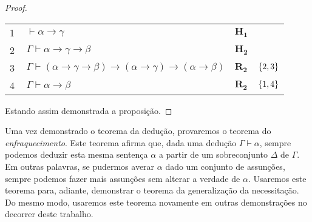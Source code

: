 \begin{tcolorbox}[enhanced jigsaw, breakable, sharp corners, colframe=black, colback=white, boxrule=0.5pt, left=1.5mm, right=1.5mm, top=1.5mm, bottom=1.5mm]
\begin{theorem}[Dedução]
\begin{proof}
\begin{case}
        \vspace{0.5\baselineskip}
        \footnotesize
        \setlength{\rowskip}{0.5\baselineskip}
        \begin{xltabular}{\textwidth}{r | X l l}
            \scriptsize{\phantom{0}1}\phantom{ } & $\ \vdash\alpha\to\gamma$                                                        & $\mathbf{H_1}$\phantom{1}                & \\[\rowskip]
            \scriptsize{\phantom{0}2}\phantom{ } & $\ \Gamma\vdash\alpha\to\gamma\to\beta$                                          & $\mathbf{H_2}$                           & \\[\rowskip]
            \scriptsize{\phantom{0}3}\phantom{ } & $\ \Gamma\vdash(\alpha\to\gamma\to\beta)\to(\alpha\to\gamma)\to(\alpha\to\beta)$ & $\hyperref[modal.rule.2]{\mathbf{R_2}}$  & $\left\{2,3\right\}$\\[\rowskip]
            \scriptsize{\phantom{0}4}\phantom{ } & $\ \Gamma\vdash\alpha\to\beta$                                                   & $\hyperref[modal.rule.2]{\mathbf{R_2}}$  & $\left\{1,4\right\}$
        \end{xltabular}
        \normalsize
        \end{case}

        \vspace{0.5\baselineskip}
        Estando assim demonstrada a proposição.
        \end{proof}
    \end{theorem}
    \end{tcolorbox}

    \vspace{.5\baselineskip}
    Uma vez demonstrado o teorema da dedução, provaremos o teorema do \emph{enfraquecimento}.
    Este teorema afirma que, dada uma dedução $\Gamma\vdash\alpha$, sempre podemos deduzir esta mesma sentença $\alpha$ a partir de um sobreconjunto $\Delta$ de $\Gamma$.
    Em outras palavras, se pudermos averar $\alpha$ dado um conjunto de assunções, sempre podemos fazer mais assunções sem alterar a verdade de $\alpha$.
    Usaremos este teorema para, adiante, demonstrar o teorema da generalização da necessitação.
    Do mesmo modo, usaremos este teorema novamente em outras demonstrações no decorrer deste trabalho.

